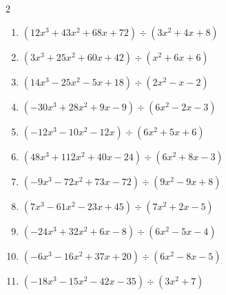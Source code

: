 \begin{multicols}{2}
\begin{enumerate}
  \item $(12x^{3}+43x^{2}+68x+72) \div (3x^{2}+4x+8)$

        \phantom{$商 : 4x+9, \quad 剰余 : -5x-7$}

  \item $(3x^{3}+25x^{2}+60x+42) \div (x^{2}+6x+6)$

        \phantom{$商 : 3x+7, \quad 剰余 : -x-1$}

\columnbreak %

  \item $(14x^{3}-25x^{2}-5x+18) \div (2x^{2}-x-2)$

        \phantom{$商 : 7x-9, \quad 剰余 : 3x$}

  \item $(-30x^{3}+28x^{2}+9x-9) \div (6x^{2}-2x-3)$

        \phantom{$商 : -5x+3, \quad 剰余 : -7x$}

  \item $(-12x^{3}-10x^{2}-12x) \div (6x^{2}+5x+6)$

        \phantom{$商 : -2x, \quad 剰余 : -3x+8$}

  \item $(48x^{3}+112x^{2}+40x-24) \div (6x^{2}+8x-3)$

        \phantom{$商 : 8x+8, \quad 剰余 : 3x-6$}

  \item $(-9x^{3}-72x^{2}+73x-72) \div (9x^{2}-9x+8)$

        \phantom{$商 : -x-9, \quad 剰余 : 2x-1$}

\columnbreak %

\resetques

  \item $(7x^{3}-61x^{2}-23x+45) \div (7x^{2}+2x-5)$

        \phantom{$商 : x-9, \quad 剰余 : x+2$}

  \item $(-24x^{3}+32x^{2}+6x-8) \div (6x^{2}-5x-4)$

        \phantom{$商 : -4x+2, \quad 剰余 : -4x+8$}

  \item $(-6x^{3}-16x^{2}+37x+20) \div (6x^{2}-8x-5)$

        \phantom{$商 : -x-4, \quad 剰余 : 5x-9$}

  \item $(-18x^{3}-15x^{2}-42x-35) \div (3x^{2}+7)$

        \phantom{$商 : -6x-5, \quad 剰余 : -7x-8$}


\end{enumerate}
\end{multicols}
